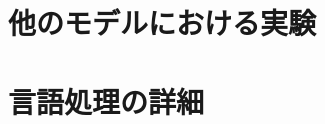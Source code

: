 \documentclass[a4j,12pt]{jreport}
\begin{document}
\acknowledgment





\appendix

\chapter{他のモデルにおける実験}


\chapter{言語処理の詳細}

\end{document}
